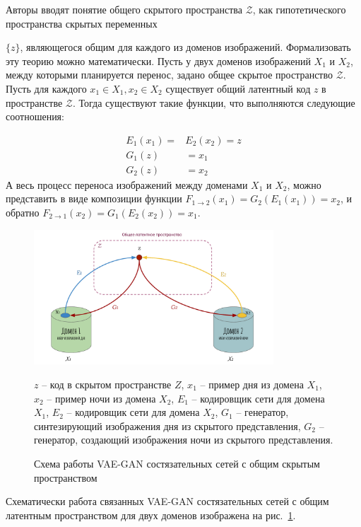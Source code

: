 \documentclass[11pt,a4paper]{extarticle}
\begin{document}
			Авторы вводят понятие общего скрытого пространства \(\mathcal{Z}\), как гипотетического пространства скрытых переменных {\(\{z\}\), являющегося общим для каждого из доменов изображений.
			Формализовать эту теорию можно математически. Пусть у двух доменов изображений \(X_1\) и \(X_2\), между которыми планируется перенос, задано общее скрытое пространство \(\mathcal{Z}\).
			Пусть для каждого \(x_1 \in X_1, x_2 \in X_2\) существует общий латентный код \(z\) в пространстве \(\mathcal{Z}\).
			Тогда существуют такие функции, что выполняются следующие соотношения:
			
			\begin{equation}
				\begin{aligned}
					E_1(x_1) = &E_2(x_2) = z\\
					G_1(z) &= x_1\\
					G_2(z) &= x_2
				\end{aligned}
			\end{equation}
			А весь процесс переноса изображений между доменами \(X_1\) и \(X_2\), можно представить в виде композиции функции \(F_{1 \rightarrow 2}(x_1) = G_2(E_1(x_1)) = x_2\),
			и обратно \(F_{2 \rightarrow 1}(x_2) = G_1(E_2(x_2)) = x_1\). 

			\begin{figure}[ht]
				\centering
				\includegraphics[width=0.8\textwidth]{img/unit}
				\caption{Схема работы VAE-GAN состязательных сетей с общим скрытым пространством}{
					\small{
						\(z\) -- код в скрытом пространстве \(Z\), \(x_1\) -- пример дня из домена \(X_1\),
						\(x_2\) -- пример ночи из домена \(X_2\), \(E_1\) -- кодировщик сети для домена \(X_1\),
						\(E_2\) -- кодировщик сети для домена \(X_2\), \(G_1\) -- генератор, синтезирующий изображения дня из скрытого представления,
						\(G_2\) -- генератор, создающий изображения ночи из скрытого представления.
					}
				}
				\label{pic:unit}
			\end{figure}
			\noindent
			Схематически работа связанных VAE-GAN состязательных сетей с общим латентным пространством для двух доменов изображена на рис.~\ref{pic:unit}.
			
}
\end{document}
